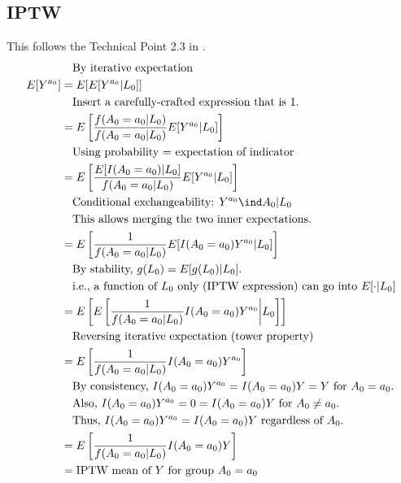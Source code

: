 \documentclass[dvipdfmx,10pt]{article}
\begin{document}
\subsection{IPTW}
\label{sec:org42b4f3d}
This follows the Technical Point 2.3 in \cite{hernanCausalInference2019}.
\begin{align*}
  &~~~\text{By iterative expectation}\\
  E[Y^{a_{0}}]
  &= E[E[Y^{a_{0}} | L_{0}]]\\
  &~~~\text{Insert a carefully-crafted expression that is 1.}\\
  &= E \left[ \frac{f(A_{0}=a_{0} | L_{0})}{f(A_{0}=a_{0} | L_{0})} E[Y^{a_{0}} | L_{0}] \right]\\
  &~~~\text{Using probability = expectation of indicator}\\
  &= E \left[ \frac{E[I(A_{0}=a_{0}) | L_{0}]}{f(A_{0}=a_{0} | L_{0})} E[Y^{a_{0}} | L_{0}] \right]\\
  &~~~\text{Conditional exchangeability: } Y^{a_{0}} \ind A_{0} | L_{0}\\
  &~~~\text{This allows merging the two inner expectations.}\\
  &= E \left[ \frac{1}{f(A_{0}=a_{0} | L_{0})} E[I(A_{0}=a_{0})Y^{a_{0}} | L_{0}] \right]\\
  &~~~\text{By stability, } g(L_{0}) = E[g(L_{0}) | L_{0}].\\
  &~~~\text{i.e., a function of $L_{0}$ only (IPTW expression) can go into $E[\cdot | L_{0}]$}\\
  &= E \left[ E \left[ \frac{1}{f(A_{0}=a_{0} | L_{0})} I(A_{0}=a_{0})Y^{a_{0}} \bigg| L_{0} \right] \right]\\
  &~~~\text{Reversing iterative expectation (tower property)}\\
  &= E \left[ \frac{1}{f(A_{0}=a_{0} | L_{0})} I(A_{0}=a_{0})Y^{a_{0}} \right]\\
  &~~~\text{By consistency, }I(A_{0}=a_{0})Y^{a_{0}} = I(A_{0}=a_{0})Y = Y \text{ for } A_{0} = a_{0}.\\
  &~~~\text{Also, }I(A_{0}=a_{0})Y^{a_{0}} = 0 = I(A_{0}=a_{0})Y \text{ for } A_{0} \ne a_{0}.\\
  &~~~\text{Thus, }I(A_{0}=a_{0})Y^{a_{0}} = I(A_{0}=a_{0})Y \text{ regardless of } A_{0}.\\
  &= E \left[ \frac{1}{f(A_{0}=a_{0} | L_{0})} I(A_{0}=a_{0})Y \right]\\
  &= \text{IPTW mean of $Y$ for group $A_{0} = a_{0}$}\\
\end{align*}
\end{document}
